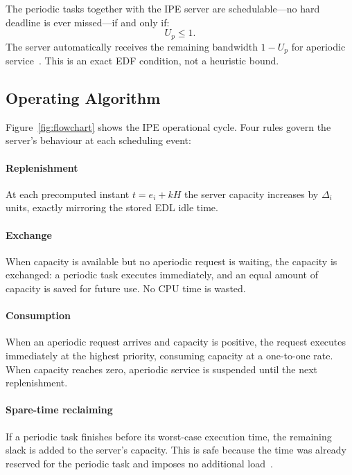 \documentclass[conference]{IEEEtran}
\begin{document}
The periodic tasks together with the IPE server are
schedulable---no hard deadline is ever missed---if and only
if:
\begin{equation}
  U_p \leq 1.
  \label{eq:sched}
\end{equation}
The server automatically receives the remaining bandwidth
$1 - U_p$ for aperiodic service~\cite{spuri1996}. This is an
exact EDF condition, not a heuristic bound.

\subsection{Operating Algorithm}

Figure~\ref{fig:flowchart} shows the IPE operational cycle.
Four rules govern the server's behaviour at each scheduling
event:

\paragraph{Replenishment} At each precomputed instant
$t = e_i + kH$ the server capacity increases by $\Delta_i$
units, exactly mirroring the stored EDL idle time.

\paragraph{Exchange} When capacity is available but no
aperiodic request is waiting, the capacity is exchanged: a
periodic task executes immediately, and an equal amount of
capacity is saved for future use. No CPU time is wasted.

\paragraph{Consumption} When an aperiodic request arrives
and capacity is positive, the request executes immediately at
the highest priority, consuming capacity at a one-to-one
rate. When capacity reaches zero, aperiodic service is
suspended until the next replenishment.

\paragraph{Spare-time reclaiming} If a periodic task
finishes before its worst-case execution time, the remaining
slack is added to the server's capacity. This is safe because
the time was already reserved for the periodic task and
imposes no additional load~\cite{buttazzo2011}.
\end{document}
